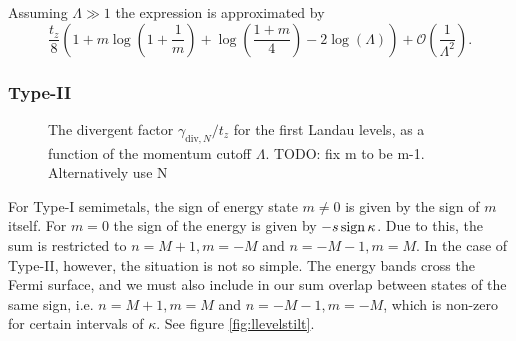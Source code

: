 Assuming \( \Lambda \gg 1 \) the expression is approximated by
\begin{equation}
  \label{eq:37}
  \frac{t_z}{8}
  \left(
  1 + m \log \left(1+\frac{1}{m}\right) + \log \left(\frac{1+m}{4}\right) - 2 \log (\Lambda)
\right) + \mathcal{O}\left(\frac{1}{\Lambda^2}\right).
\end{equation}


\subsubsection{Type-II}


\begin{figure}[hp]
  \centering
  \caption{The divergent factor \( \gamma_{\text{div}, N} / t_{z} \) for the first Landau levels, as a function of the momentum cutoff \( \Lambda \).
    TODO: fix m to be m-1. Alternatively use N}
  \label{fig:divergent-factor}
\end{figure}
For Type-I semimetals, the sign of energy state \( m \neq 0 \) is given by the sign of \( m \) itself.
For \( m = 0 \) the sign of the energy is given by \( -s \operatorname{sign}{\kappa } \).
Due to this, the sum is restricted to \( n=M+1, m=-M \) and \( n=-M-1, m=M \).
In the case of Type-II, however, the situation is not so simple.
The energy bands cross the Fermi surface, and we must also include in our sum overlap between states of the same sign, i.e. \( n=M+1, m=M \) and \( n=-M-1, m=-M \), which is non-zero for certain intervals of \( \kappa  \).
See figure \ref{fig:llevelstilt}.

